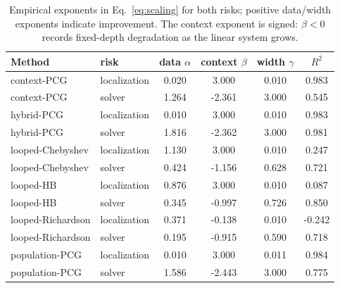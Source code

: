 \documentclass[10pt]{article}
\begin{document}
\begin{table}[t]
\centering\small
\caption{Empirical exponents in Eq.~\eqref{eq:scaling} for both risks;
positive data/width exponents indicate improvement.  The context exponent is
signed: $\beta<0$ records fixed-depth degradation as the linear system grows.}
\begin{tabular}{llcccc}
\toprule Method & risk & data $\alpha$ & context $\beta$ & width $\gamma$ & $R^2$\\
\midrule
context-PCG & localization & 0.020 & 3.000 & 0.010 & 0.983 \\
context-PCG & solver & 1.264 & -2.361 & 3.000 & 0.545 \\
hybrid-PCG & localization & 0.010 & 3.000 & 0.010 & 0.983 \\
hybrid-PCG & solver & 1.816 & -2.362 & 3.000 & 0.981 \\
looped-Chebyshev & localization & 1.130 & 3.000 & 0.010 & 0.247 \\
looped-Chebyshev & solver & 0.424 & -1.156 & 0.628 & 0.721 \\
looped-HB & localization & 0.876 & 3.000 & 0.010 & 0.087 \\
looped-HB & solver & 0.345 & -0.997 & 0.726 & 0.850 \\
looped-Richardson & localization & 0.371 & -0.138 & 0.010 & -0.242 \\
looped-Richardson & solver & 0.195 & -0.915 & 0.590 & 0.718 \\
population-PCG & localization & 0.010 & 3.000 & 0.011 & 0.984 \\
population-PCG & solver & 1.586 & -2.443 & 3.000 & 0.775 \\
\bottomrule
\end{tabular}
\end{table}

\FloatBarrier
\end{document}
